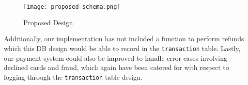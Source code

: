 \begin{figure}[!hbt]
  \centering
 	\texttt{[image: proposed-schema.png]}
  \caption{Proposed Design}
 	\label{fig:proposed-schema}
\end{figure}

Additionally, our implementation has not included a function to perform refunds which this DB design would be able to record in the \texttt{transaction} table. Lastly, our payment system could also be improved to handle error cases involving declined cards and fraud, which again have been catered for with respect to logging through the \texttt{transaction} table design.
